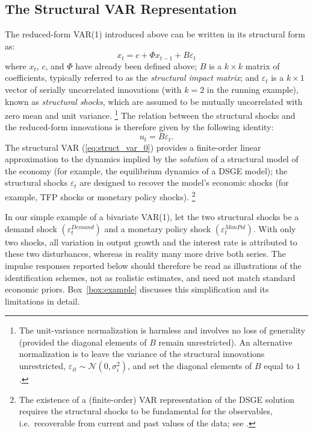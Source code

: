 \documentclass[12pt]{article}
\makeatletter
\newcommand*\codesize{\@setfontsize\codesize{9.0}{10.5}}
\newcommand*\mcsize{\@setfontsize\mcsize{10.0}{11.5}}
\newcommand{\mc}[1]{\colorbox{script!80}{\mcsize\texttt{#1}}}
\newcommand{\mci}[1]{\colorbox{script!80}{\texttt{#1}}}
\let\oldfootnote\footnote
\renewcommand{\footnote}[1]{%
  \oldfootnote{{\renewcommand{\mc}[1]{\colorbox{script!80}{\codesize\texttt{##1}}}%
               \renewcommand{\mci}[1]{\colorbox{script!80}{\codesize\texttt{##1}}}#1}}%
}
\makeatother
\begin{document}
\subsection{The Structural VAR Representation}\label{sec:struct_var}

The reduced-form VAR(1) introduced above can be written in its structural form as:
\begin{equation}
	x_{t} = c + \Phi x_{t-1}+B\varepsilon_{t}
	\label{eq:struct_var_0}
\end{equation}%
where $x_{t}$, $c$, and $\Phi$ have already been defined above; $B$ is a $k \times k$ matrix of coefficients, typically referred to as the \textit{structural impact matrix}; and $\varepsilon_{t}$ is a $k \times 1$ vector of serially uncorrelated innovations (with $k=2$ in the running example), known as \textit{structural shocks}, which are assumed to be mutually uncorrelated with zero mean and unit variance.\footnote{The unit-variance normalization is harmless and involves no loss of generality (provided the diagonal elements of $B$ remain unrestricted). An alternative normalization is to leave the variance of the structural innovations unrestricted, $\varepsilon_{it}\sim \mathcal{N}(0,\sigma_i^2)$, and set the diagonal elements of $B$ equal to $1$.} The relation between the structural shocks and the reduced-form innovations is therefore given by the following identity:
\begin{equation}\label{eq:struct_shocks}
	u_{t} = B\varepsilon_{t}.
\end{equation}%
The structural VAR (\ref{eq:struct_var_0}) provides a finite-order linear approximation to the dynamics implied by the \textit{solution} of a structural model of the economy (for example, the equilibrium dynamics of a DSGE model); the structural shocks $\varepsilon_t$ are designed to recover the model's economic shocks (for example, TFP shocks or monetary policy shocks).\footnote{The existence of a (finite-order) VAR representation of the DSGE solution requires the structural shocks to be fundamental for the observables, i.e.\ recoverable from current and past values of the data; see \cite{FernandezVillaverdeRubioRamirezSargentWatson2007}.}

In our simple example of a bivariate VAR(1), let the two structural shocks be a demand shock $\left( \varepsilon_{t}^{Demand} \right)$ and a monetary policy shock $\left( \varepsilon_{t}^{MonPol} \right)$. With only two shocks, all variation in output growth and the interest rate is attributed to these two disturbances, whereas in reality many more drive both series. The impulse responses reported below should therefore be read as illustrations of the identification schemes, not as realistic estimates, and need not match standard economic priors. Box~\ref{box:example} discusses this simplification and its limitations in detail.
\end{document}
